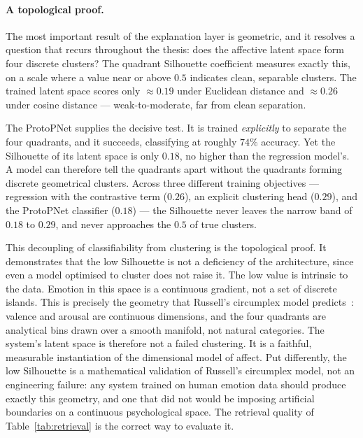 \documentclass[12pt]{report}
\begin{document}
\paragraph{A topological proof.} The most important result of the explanation layer is geometric, and it resolves a question that recurs throughout the thesis: does the affective latent space form four discrete clusters? The quadrant Silhouette coefficient measures exactly this, on a scale where a value near or above $0.5$ indicates clean, separable clusters. The trained latent space scores only $\approx 0.19$ under Euclidean distance and $\approx 0.26$ under cosine distance --- weak-to-moderate, far from clean separation.

The ProtoPNet supplies the decisive test. It is trained \emph{explicitly} to separate the four quadrants, and it succeeds, classifying at roughly $74\%$ accuracy. Yet the Silhouette of its latent space is only $0.18$, no higher than the regression model's. A model can therefore tell the quadrants apart without the quadrants forming discrete geometrical clusters. Across three different training objectives --- regression with the contrastive term ($0.26$), an explicit clustering head ($0.29$), and the ProtoPNet classifier ($0.18$) --- the Silhouette never leaves the narrow band of $0.18$ to $0.29$, and never approaches the $0.5$ of true clusters.

This decoupling of classifiability from clustering is the topological proof. It demonstrates that the low Silhouette is not a deficiency of the architecture, since even a model optimised to cluster does not raise it. The low value is intrinsic to the data. Emotion in this space is a continuous gradient, not a set of discrete islands. This is precisely the geometry that Russell's circumplex model predicts~\cite{russell_circumplex_1980}: valence and arousal are continuous dimensions, and the four quadrants are analytical bins drawn over a smooth manifold, not natural categories. The system's latent space is therefore not a failed clustering. It is a faithful, measurable instantiation of the dimensional model of affect. Put differently, the low Silhouette is a mathematical validation of Russell's circumplex model, not an engineering failure: any system trained on human emotion data should produce exactly this geometry, and one that did not would be imposing artificial boundaries on a continuous psychological space. The retrieval quality of Table~\ref{tab:retrieval} is the correct way to evaluate it.
\end{document}
